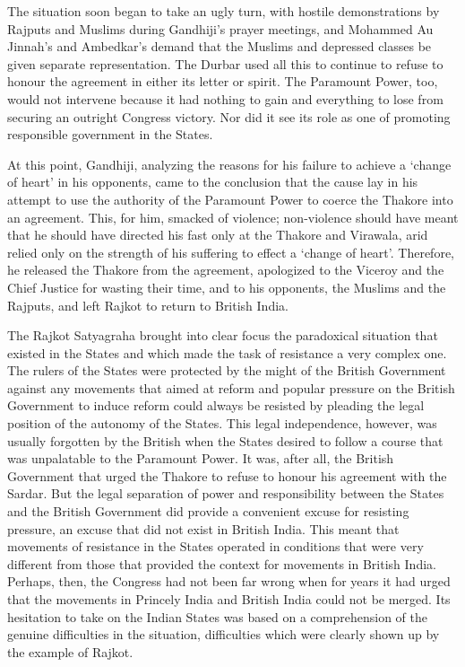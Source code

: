 \begin{multicols}{2}
The situation soon began to take an ugly turn, with hostile demonstrations by Rajputs and Muslims during Gandhiji's prayer meetings, and Mohammed Au Jinnah's and Ambedkar's demand that the Muslims and depressed classes be given separate representation. The Durbar used all this to continue to refuse to honour the agreement in either its letter or spirit. The Paramount Power, too, would not intervene because it had nothing to gain and everything to lose from securing an outright Congress victory. Nor did it see its role as one of promoting responsible government in the States. 

At this point, Gandhiji, analyzing the reasons for his failure to achieve a `change of heart' in his opponents, came to the conclusion that the cause lay in his attempt to use the authority of the Paramount Power to coerce the Thakore into an agreement. This, for him, smacked of violence; non-violence should have meant that he should have directed his fast only at the Thakore and Virawala, arid relied only on the strength of his suffering to effect a `change of heart'. Therefore, he released the Thakore from the agreement, apologized to the Viceroy and the Chief Justice for wasting their time, and to his opponents, the Muslims and the Rajputs, and left Rajkot to return to British India. 

The Rajkot Satyagraha brought into clear focus the paradoxical situation that existed in the States and which made the task of resistance a very complex one. The rulers of the States were protected by the might of the British Government against any movements that aimed at reform and popular pressure on the British Government to induce reform could always be resisted by pleading the legal position of the autonomy of the States. This legal independence, however, was usually forgotten by the British when the States desired to follow a course that was unpalatable to the Paramount Power. It was, after all, the British Government that urged the Thakore to refuse to honour his agreement with the Sardar. But the legal separation of power and responsibility between the States and the British Government did provide a convenient excuse for resisting pressure, an excuse that did not exist in British India. This meant that movements of resistance in the States operated in conditions that were very different from those that provided the context for movements in British India. Perhaps, then, the Congress had not been far wrong when for years it had urged that the movements in Princely India and British India could not be merged. Its hesitation to take on the Indian States was based on a comprehension of the genuine difficulties in the situation, difficulties which were clearly shown up by the example of Rajkot. 


\end{multicols}
